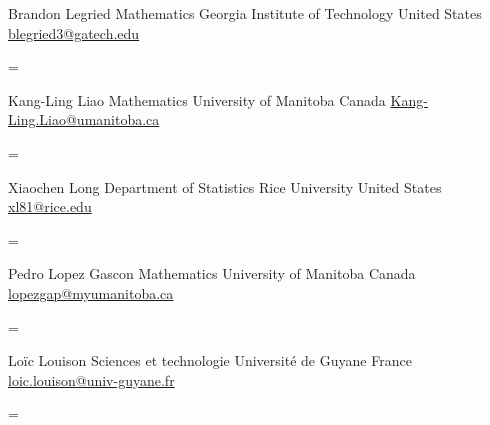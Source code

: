 \documentclass[
  letterpaper,
  DIV=11,
  numbers=noendperiod]{scrartcl}
\newenvironment{absolutelynopagebreak}
  {\par\nobreak\vfil\penalty0\vfilneg
   \vtop\bgroup}
  {\par\xdef\tpd{\the\prevdepth}\egroup
   \prevdepth=\tpd}
\begin{document}
\begin{absolutelynopagebreak}Brandon   Legried \newline
\mbox{}\quad  Mathematics \newline
\mbox{}\quad  Georgia Institute of Technology \newline
\mbox{}\quad  United States \newline
\mbox{}\quad \href{mailto: blegried3@gatech.edu }{ blegried3@gatech.edu }
\end{absolutelynopagebreak}\vskip0.2cm
\begin{absolutelynopagebreak}Kang-Ling   Liao \newline
\mbox{}\quad  Mathematics \newline
\mbox{}\quad  University of Manitoba \newline
\mbox{}\quad  Canada \newline
\mbox{}\quad \href{mailto: Kang-Ling.Liao@umanitoba.ca }{ Kang-Ling.Liao@umanitoba.ca }
\end{absolutelynopagebreak}\vskip0.2cm
\begin{absolutelynopagebreak}Xiaochen   Long \newline
\mbox{}\quad  Department of Statistics \newline
\mbox{}\quad  Rice University \newline
\mbox{}\quad  United States \newline
\mbox{}\quad \href{mailto: xl81@rice.edu }{ xl81@rice.edu }
\end{absolutelynopagebreak}\vskip0.2cm
\begin{absolutelynopagebreak}Pedro   Lopez Gascon \newline
\mbox{}\quad  Mathematics \newline
\mbox{}\quad  University of Manitoba \newline
\mbox{}\quad  Canada \newline
\mbox{}\quad \href{mailto: lopezgap@myumanitoba.ca }{ lopezgap@myumanitoba.ca }
\end{absolutelynopagebreak}\vskip0.2cm
\begin{absolutelynopagebreak}Loïc   Louison \newline
\mbox{}\quad  Sciences et technologie \newline
\mbox{}\quad  Université de Guyane \newline
\mbox{}\quad  France \newline
\mbox{}\quad \href{mailto: loic.louison@univ-guyane.fr }{ loic.louison@univ-guyane.fr }
\end{absolutelynopagebreak}\vskip0.2cm
\end{document}
